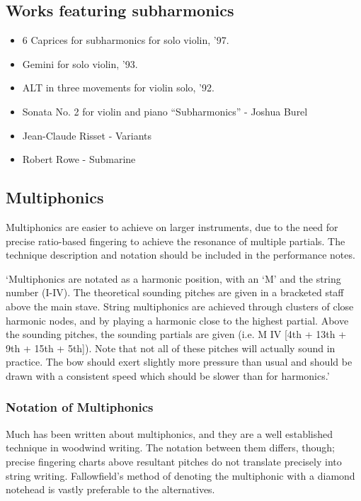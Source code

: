 \subsection{Works featuring subharmonics }\label{sec:subharmonicsLiterature}

\begin{itemize}
    \item 6 Caprices for subharmonics for solo violin, '97.
    \item Gemini for solo violin, '93.
    \item ALT in three movements for violin solo, '92.
    \item Sonata No. 2 for violin and piano “Subharmonics” - Joshua Burel
    \item Jean-Claude Risset - Variants
    \item Robert Rowe - Submarine
\end{itemize}

\subsection{Multiphonics} \label{sec:multiphonics}
Multiphonics are easier to achieve on larger instruments, due to the need for precise ratio-based fingering to achieve the resonance of multiple partials.
The technique description and notation should be included in the performance notes.


`Multiphonics are notated as a harmonic position, with an `M' and the string number (I-IV). 
The theoretical sounding pitches are given in a bracketed staff above the main stave.
String multiphonics are achieved through clusters of close harmonic nodes, and by playing a harmonic close to the highest partial.
Above the sounding pitches, the sounding partials are given (i.e. M IV [4th + 13th + 9th + 15th + 5th]).
Note that not all of these pitches will actually sound in practice.
The bow should exert slightly more pressure than usual and should be drawn with a consistent speed which should be slower than for harmonics.'

\subsubsection{Notation of Multiphonics} \label{sec:notation-multiphonics}
Much has been written about multiphonics, and they are a well established technique in woodwind writing.
The notation between them differs, though; precise fingering charts above resultant pitches do not translate precisely into string writing.
Fallowfield's method of denoting the multiphonic with a diamond notehead is vastly preferable to the alternatives.


